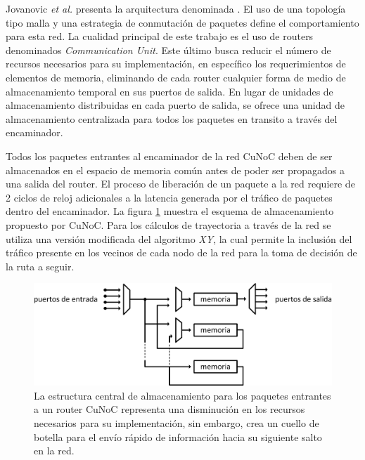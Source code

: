 Jovanovic \textit{et al.} presenta la arquitectura denominada \cite{chapter3:4380761}. El uso de una topología tipo malla y una estrategia de conmutación de paquetes define el comportamiento para esta red. La cualidad principal de este trabajo es el uso de routers denominados \textit{Communication Unit}. Este último busca reducir el número de recursos necesarios para su implementación, en específico los requerimientos de elementos de memoria, eliminando de cada router cualquier forma de medio de almacenamiento temporal en sus puertos de salida. En lugar de unidades de almacenamiento distribuidas en cada puerto de salida, se ofrece una unidad de almacenamiento centralizada para todos los paquetes en transito a través del encaminador.

Todos los paquetes entrantes al encaminador de la red CuNoC deben de ser almacenados en el espacio de memoria común antes de poder ser propagados a una salida del router. El proceso de liberación de un paquete a la red requiere de 2 ciclos de reloj adicionales a la latencia generada por el tráfico de paquetes dentro del encaminador. La figura \ref{fig:ch3_cunoc} muestra el esquema de almacenamiento propuesto por CuNoC. Para los cálculos de trayectoria a través de la red se utiliza una versión modificada del algoritmo \textit{XY}, la cual permite la inclusión del tráfico presente en los vecinos de cada nodo de la red para la toma de decisión de la ruta a seguir.

\begin{figure}
	\begin{center}
		\includegraphics[scale=0.6]{figures/ch3_cunoc.png}
	\end{center}
	\caption
		{	
			La estructura central de almacenamiento para los paquetes entrantes a un router CuNoC representa una disminución en los recursos necesarios para su implementación, sin embargo, crea un cuello de botella para el envío rápido de información hacia su siguiente salto en la red.
		}
	\label{fig:ch3_cunoc}
\end{figure}

